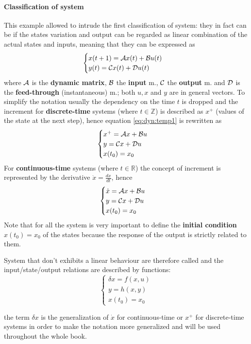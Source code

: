	\paragraph{Classification of system} This example allowed to intrude the first classification of system: they in fact can be  if the states variation and output can be regarded as linear combination of the actual states and inputs, meaning that they can be expressed as
	\begin{equation} \label{eq:dyn:temp1}
	\begin{cases}
		x(t+1) = \mathcal{A} x(t) + \mathcal{B} u(t) \\ y(t) = \mathcal{C} x(t) + \mathcal{D} u(t)
	\end{cases}
	\end{equation}
	where $\mathcal{A}$ is the \textbf{dynamic matrix}, $\mathcal{B}$ the \textbf{input} m., $\mathcal{C}$ the \textbf{output} m. and $\mathcal{D}$ is the \textbf{feed-through} (instantaneous) m.; both $u,x$ and $y$ are in general vectors. To simplify the notation usually the dependency on the time $t$ is dropped and the increment for \textbf{discrete-time} systems (where $t\in \mathds Z$) is described as $x^+$ (values of the state at the next step), hence equation \ref{eq:dyn:temp1} is rewritten as
	\begin{equation} \label{eq:dyn:LTIdiscrete}
		\begin{cases}
			x^+ = \mathcal{A} x + \mathcal{B} u \\ y = \mathcal{C} x + \mathcal{D} u \\ x(t_0) = x_0
		\end{cases}
	\end{equation}
	For \textbf{continuous-time} systems (where $t\in \mathds R$) the concept of increment is represented by the derivative $\dot x = \frac{dx}{dt}$, hence
	\begin{equation} \label{eq:dyn:LTIcontinuous}
		\begin{cases}
			\dot x = \mathcal{A} x + \mathcal{B} u \\ y = \mathcal{C} x + \mathcal{D} u \\ x(t_0) = x_0
		\end{cases}
	\end{equation}
	Note that for all the system is very important to define the \textbf{initial condition} $x(t_0) = x_0$ of the states because the response of the output is strictly related to them.
	
	System that don't exhibits a linear behaviour are therefore called  and the input/state/output relations are described by functions:
	\begin{equation}
	\begin{cases}
		\delta x = f(x,u) \\
		y = h(x,y) \\
		x(t_0) = x_0
	\end{cases}
	\end{equation}
	\begin{note}
		the term $\delta x$ is the generalization of $\dot x$ for continuous-time or $x^+$ for discrete-time systems in order to make the notation more generalized and will be used throughout the whole book.
	\end{note}
	
